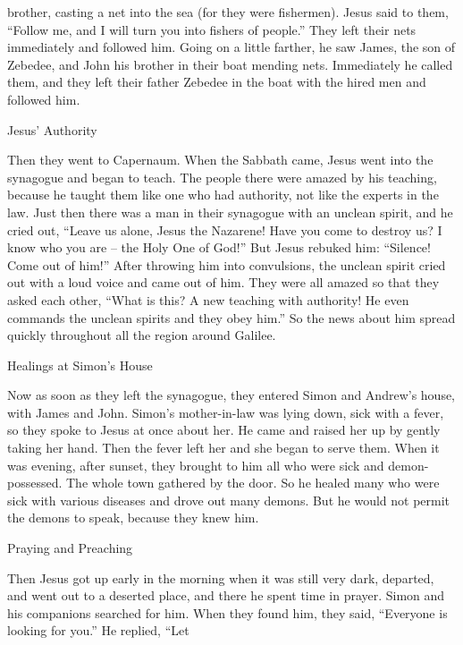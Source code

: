 {brother,
casting
a net into
the sea
(for
they were
fishermen).
Jesus
said
to them,
“Follow
me,
and
I will turn
you
into
fishers
of people.”
They left
their nets
immediately
and followed
him.
Going on
a little farther,
he saw
James,
the son of Zebedee,
and
John
his
brother
in
their boat
mending
nets.
Immediately
he called
them,
and
they left
their father
Zebedee
in
the boat
with
the hired men
and followed
him.
\par }{\SH Jesus’ Authority
\par }{\PP {}Then
they went
to
Capernaum.
When the Sabbath
came, Jesus went
into
the synagogue
and began to teach.
The people there
were amazed
by
his
teaching,
because
he taught
them
like
one who had
authority,
not
like
the experts in the law.
Just
then there was
a man
in
their
synagogue
with
an unclean
spirit,
and
he cried out,
“Leave us
alone, Jesus
the Nazarene! Have you come
to destroy
us? I know
who
you
are
– the Holy One
of God!”
But
Jesus
rebuked
him: “Silence! Come out
of
him!”
After throwing
him
into convulsions,
the unclean
spirit
cried out
with a loud
voice
and came out
of
him.
They were
all
amazed
so that
they
asked
each other, “What
is
this? A new
teaching
with
authority! He
even commands
the unclean
spirits
and
they obey
him.”
So
the news
about him
spread
quickly
throughout
all the region
around
Galilee.
\par }{\SH Healings at Simon’s House
\par }{\PP {}Now as soon as
they left
the synagogue,
they entered
Simon
and
Andrew’s
house,
with
James
and
John.
Simon’s
mother-in-law
was lying down,
sick with a fever,
so
they spoke
to Jesus
at once
about
her.
He
came
and raised
her
up
by
gently taking
her hand.
Then
the fever
left
her
and
she began to serve
them.
When
it was
evening,
after sunset,
they brought
to
him
all
who were
sick
and
demon-possessed.
The
whole
town
gathered
by
the door.
So
he healed
many
who were
sick
with various
diseases
and
drove out
many
demons.
But
he would
not
permit
the demons
to speak,
because
they knew
him.
\par }{\SH Praying and Preaching
\par }{\PP {}Then
Jesus got up
early in the morning
when it was still
very
dark,
departed,
and
went out
to
a deserted
place,
and there
he spent time in prayer.
Simon
and
his companions
searched for
him.
When
they found
him,
they said,
“Everyone
is looking for
you.”
He replied, “Let
}
